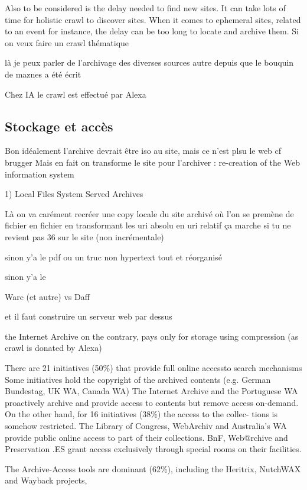 \documentclass[symmetric,justified,marginals=raggedouter]{tufte-book}
\begin{document}
Also to be considered is the delay needed to find new sites. It can take lots of time for holistic crawl to discover sites. When it comes to ephemeral sites, related to an event for instance, the delay can be too long to locate and archive them. Si on veux faire un crawl thématique

là je peux parler de l'archivage des diverses sources autre depuis que le bouquin de maznes a été écrit

Chez IA le crawl est effectué par Alexa

\subsection{Stockage et accès}

Bon idéalement l'archive devrait être iso au site, mais ce n'est plsu le web cf brugger 
Mais en fait on transforme le site pour l'archiver : re-creation of the Web information system

1) Local Files System Served Archives

Là on va carément recréer une copy locale du site archivé où l'on se premène de fichier en fichier en transformant les uri absolu en uri relatif
ça marche si tu ne revient pas 36 sur le site (non incrémentale)

sinon y'a le pdf ou un truc non hypertext tout et réorganisé

sinon y'a le 

Warc (et autre) vs Daff

et il faut construire un serveur web par dessus 

the Internet Archive on the contrary, pays only for storage using compression (as crawl is donated by Alexa)

There are 21 initiatives (50\%) that provide full online accessto search mechanisms
Some initiatives hold the copyright of the
archived contents (e.g. German Bundestag, UK WA, Canada WA)
The Internet Archive
and the Portuguese WA proactively archive and provide access to contents but remove
access on-demand.
On the other hand, for 16 initiatives (38\%) the access to the collec-
tions is somehow restricted. The Library of Congress, WebArchiv and Australia’s WA
provide public online access to part of their collections.
BnF, Web@rchive and Preservation .ES grant
access exclusively through special rooms on their facilities.

The Archive-Access tools are dominant (62\%), including the Heritrix,
NutchWAX and Wayback projects,
\end{document}
